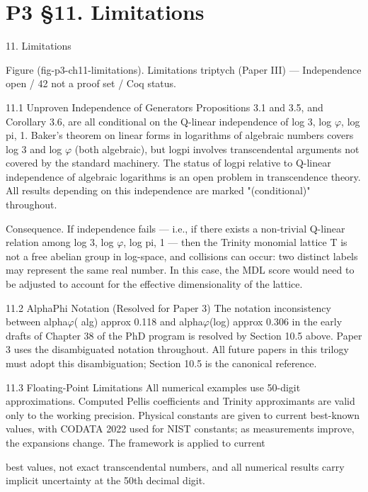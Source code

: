 
\section{P3 §11. Limitations}

11. Limitations

   Figure (fig-p3-ch11-limitations). Limitations triptych (Paper III) --- Independence open / 42 not a
                                         proof set / Coq status.

  11.1 Unproven Independence of Generators
  Propositions 3.1 and 3.5, and Corollary 3.6, are all conditional on the Q-linear
  independence of log 3, log $\varphi$, log pi, 1. Baker's theorem on linear forms in logarithms of
  algebraic numbers covers log 3 and log $\varphi$ (both algebraic), but logpi involves
  transcendental arguments not covered by the standard machinery. The status of logpi
  relative to Q-linear independence of algebraic logarithms is an open problem in
  transcendence theory. All results depending on this independence are marked
  "(conditional)" throughout.

  Consequence. If independence fails --- i.e., if there exists a non-trivial Q-linear relation
  among log 3, log $\varphi$, log pi, 1 --- then the Trinity monomial lattice T is not a free abelian
  group in log-space, and collisions can occur: two distinct labels may represent the same
  real number. In this case, the MDL score would need to be adjusted to account for the
  effective dimensionality of the lattice.

  11.2 AlphaPhi Notation (Resolved for Paper 3)
  The notation inconsistency between alpha$\varphi$( alg) approx 0.118 and alpha$\varphi$(log) approx
  0.306 in the early drafts of Chapter 38 of the PhD program is resolved by Section 10.5
  above. Paper 3 uses the disambiguated notation throughout. All future papers in this
  trilogy must adopt this disambiguation; Section 10.5 is the canonical reference.

  11.3 Floating-Point Limitations
  All numerical examples use 50-digit approximations. Computed Pellis coefficients and
  Trinity approximants are valid only to the working precision. Physical constants are
  given to current best-known values, with CODATA 2022 used for NIST constants; as
  measurements improve, the expansions change. The framework is applied to current

  best values, not exact transcendental numbers, and all numerical results carry implicit
  uncertainty at the 50th decimal digit.

